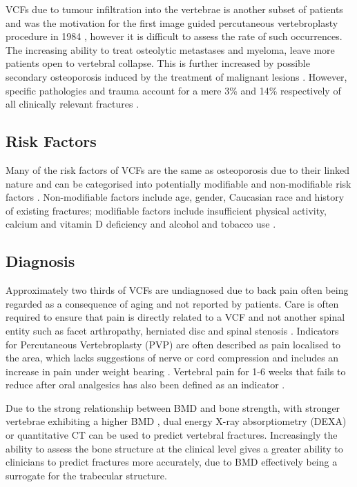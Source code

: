 VCFs due to tumour infiltration into the vertebrae is another subset of
patients and was the motivation for the first image guided percutaneous
vertebroplasty procedure in 1984 \cite{Burstein1987}, however it is
difficult
to
assess the rate of such occurrences. The increasing ability to treat
osteolytic metastases and myeloma, leave more patients open to vertebral
collapse. This is further increased by possible secondary osteoporosis
induced by the treatment of malignant lesions \cite{Mathis2001}. However,
specific
pathologies and trauma account for a mere 3\% and 14\% respectively of
all clinically relevant fractures \cite{MeltonIII2006}.

\subsection{Risk Factors}\label{risk-factors}

Many of the risk factors of VCFs are the same as osteoporosis due to
their linked nature and can be categorised into potentially modifiable
and non-modifiable risk factors \cite{Studies2006}. Non-modifiable factors
include
age, gender, Caucasian race and history of existing fractures;
modifiable factors include insufficient physical activity, calcium and
vitamin D deficiency and alcohol and tobacco use \cite{Studies2006}.

\subsection{Diagnosis}\label{diagnosis}

Approximately two thirds of VCFs are undiagnosed \cite{Cooper1993} due to back
pain often being regarded as a consequence of aging and not reported by
patients. Care is often required to ensure that pain is directly related
to a VCF and not another spinal entity such as facet arthropathy,
herniated disc and spinal stenosis \cite{Mathis2001}. Indicators for Percutaneous Vertebroplasty (PVP) are
often
described as pain localised to the area, which lacks suggestions of
nerve or cord compression and includes an increase in pain under
weight bearing \cite{Mathis2001}. Vertebral pain for 1-6 weeks that fails to
reduce
after oral analgesics has also been defined as an indicator \cite{Diamond2006}.

Due to the strong relationship between BMD and bone strength, with
stronger vertebrae exhibiting a higher BMD \cite{Moro1995}, dual energy
X-ray
absorptiometry (DEXA) or quantitative CT can be used to predict
vertebral fractures. Increasingly the ability to assess the bone
structure at the clinical level gives a greater ability to clinicians to
predict fractures more accurately, due to BMD effectively being a
surrogate for the trabecular structure.

